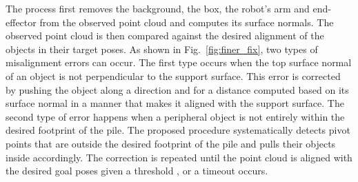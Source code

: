 The process first removes the background, the box, the robot's arm and end-effector from the observed point cloud and computes its surface normals.
The observed point cloud is then compared against the desired alignment of the objects in their target poses. As shown in Fig.~\ref{fig:finer_fix}, two types of misalignment errors can occur. The first type occurs when the top surface normal of an object is not perpendicular to the support surface. This error is corrected by pushing the object along a direction and for a distance computed based on its surface normal in a manner that makes it aligned with the support surface. 
The second type of error happens when a peripheral object is not entirely within the desired footprint of the pile. The proposed procedure systematically detects pivot points that are outside the desired footprint of the pile and pulls their objects inside accordingly. The correction is repeated until the point cloud is  aligned with the desired goal poses given a threshold
\changkyu{$\tau$}, or a timeout occurs.

